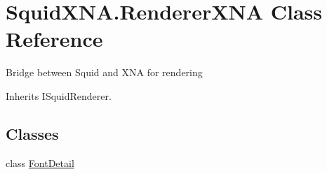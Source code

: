 \hypertarget{class_squid_x_n_a_1_1_renderer_x_n_a}{\section{Squid\+X\+N\+A.\+Renderer\+X\+N\+A Class Reference}
\label{class_squid_x_n_a_1_1_renderer_x_n_a}
}


Bridge between Squid and X\+N\+A for rendering  




Inherits I\+Squid\+Renderer.

\subsection*{Classes}
\begin{DoxyCompactItemize}
\item 
class \hyperlink{class_squid_x_n_a_1_1_renderer_x_n_a_1_1_font_detail}{Font\+Detail}
\end{DoxyCompactItemize}
